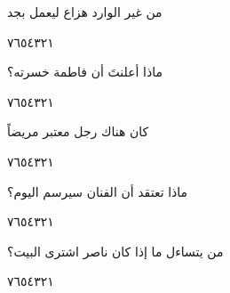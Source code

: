 \documentclass[11pt, a4paper]{article}
\begin{document}
	
	{\begin{flushright}
\textarabic{من غير الوارد هزاع ليعمل بجد}
\end{flushright}

\begin{center}
        \hfill\textarabic{٧}\hfill\textarabic{٦}\hfill\textarabic{٥}\hfill\textarabic{٤}\hfill\textarabic{٣}\hfill\textarabic{٢}\hfill\textarabic{١}
        \end{center}


\vspace{0.5\baselineskip}\begin{flushright}
\textarabic{ماذا أعلنتَ أن فاطمة خسرته؟}
\end{flushright}

\begin{center}
        \hfill\textarabic{٧}\hfill\textarabic{٦}\hfill\textarabic{٥}\hfill\textarabic{٤}\hfill\textarabic{٣}\hfill\textarabic{٢}\hfill\textarabic{١}
        \end{center}


\vspace{0.5\baselineskip}\begin{flushright}
\textarabic{كان هناك رجل معتبر مريضاً}
\end{flushright}

\begin{center}
        \hfill\textarabic{٧}\hfill\textarabic{٦}\hfill\textarabic{٥}\hfill\textarabic{٤}\hfill\textarabic{٣}\hfill\textarabic{٢}\hfill\textarabic{١}
        \end{center}


\vspace{0.5\baselineskip}\begin{flushright}
\textarabic{ماذا تعتقد أن الفنان سيرسم اليوم؟}
\end{flushright}

\begin{center}
        \hfill\textarabic{٧}\hfill\textarabic{٦}\hfill\textarabic{٥}\hfill\textarabic{٤}\hfill\textarabic{٣}\hfill\textarabic{٢}\hfill\textarabic{١}
        \end{center}


\vspace{0.5\baselineskip}\begin{flushright}
\textarabic{من يتساءل ما إذا كان ناصر اشترى البيت؟}
\end{flushright}

\begin{center}
        \hfill\textarabic{٧}\hfill\textarabic{٦}\hfill\textarabic{٥}\hfill\textarabic{٤}\hfill\textarabic{٣}\hfill\textarabic{٢}\hfill\textarabic{١}
        \end{center}


}
\end{document}
